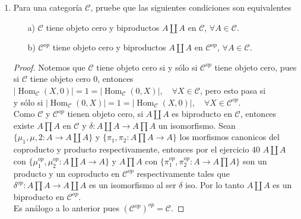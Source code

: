 \documentclass{article}
\begin{document}
\begin{enumerate}[label=\textbf{Ej \arabic*.}]
\begin{proof}
			Por lo tanto $\varphi$ es único y así $R$ y $\{proy_j:R\to R_i\}_{i=1}^n$ son un producto en $Rings$ para $\{R_i\}_{i=1}^n$.
			
		\end{proof}
		\item Para una categoría $\mathscr{C}$, pruebe que las siguientes condiciones son equivalentes
		
		\begin{itemize}
			\item[a)] $\mathscr{C}$ tiene objeto cero y biproductos $A\coprod A$ en  $\mathscr{C}$, $\forall A\in \mathscr{C}$.
			\item[b)] $\mathscr{C}^{op}$ tiene objeto cero y biproductos $A\coprod A$ en  $\mathscr{C}^{op}$, $\forall A\in \mathscr{C}$.
		\end{itemize}
		
		\begin{proof}
			Notemos que $\mathscr{C}$ tiene objeto cero si y sólo si $\mathscr{C}^{op}$ tiene objeto cero, pues si $\mathscr{C}$ tiene objeto cero $0$, entonces\\
			$|\operatorname{Hom}_{\mathscr{C}}(X,0)|=1=|\operatorname{Hom}_{\mathscr{C}}(0,X)|,\quad \forall X\in \mathscr{C}$, pero esto pasa si \\
			y sólo si $|\operatorname{Hom}_{\mathscr{C}}(0,X)|=1=|\operatorname{Hom}_{\mathscr{C}}(X,0)|,\quad \forall X\in \mathscr{C}^{op}$.\\
			
			 Como $\mathscr{C}$ y $\mathscr{C}^{op}$ tienen objeto cero, si $A\coprod A$ es biproducto en $\mathscr{C}$, entonces 
			existe $A\prod A$ en $\mathscr{C}$ y $\delta:A\coprod A\longrightarrow A\prod A$ un isomorfismo. Sean $\{\mu_1,\mu,2:A\longrightarrow A\coprod A\}$
			\quad y \quad $\{\pi_1,\pi_2:A\prod A \longrightarrow A\}$ los morfismos canonicos del coproducto y producto respectivamente, entonces por el 
			ejercicio 40 $A\coprod A$ con $\{\mu_1^{op},\mu_2^{op}:A\coprod A\longrightarrow A\}$ y $A\prod A$ con 
			$\{\pi_1^{op},\pi_2^{op}:A\longrightarrow A\prod A \}$ son un producto y un coproducto en $\mathscr{C}^{op}$ respectivamente tales que 
			$\delta^{op}:A\prod A\longrightarrow A\coprod A$ es un isomorfismo al ser $\delta$ iso. Por lo tanto $A\coprod A$ es un biproducto en 
			$\mathscr{C}^{op}$.\\
			
			 Es análogo a lo anterior pues $(\mathscr{C}^{op})^{op}=\mathscr{C}$.
			

\end{proof}
\end{enumerate}
\end{document}
